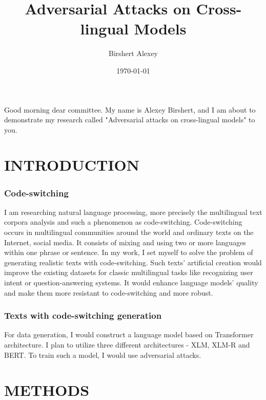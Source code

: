 \documentclass{beamer}
\title{Adversarial Attacks on Cross-lingual Models}
\author{Birshert Alexey}
\date{\today}
\begin{document}
\begin{frame}
Good morning dear committee. My name is Alexey Birshert, and I am about to demonstrate my research called "Adversarial attacks on cross-lingual models" to you.
\end{frame}


\section{INTRODUCTION}

\begin{frame}
\frametitle{Code-switching}
I am researching natural language processing, more precisely the multilingual text corpora analysis and such a phenomenon as code-switching. Code-switching occurs in multilingual communities around the world and ordinary texts on the Internet, social media. It consists of mixing and using two or more languages within one phrase or sentence. In my work, I set myself to solve the problem of generating realistic texts with code-switching. Such texts’ artificial creation would improve the existing datasets for classic multilingual tasks like recognizing user intent or question-answering systems. It would enhance language models’ quality and make them more resistant to code-switching and more robust.
\end{frame}


\begin{frame}
\frametitle{Texts with code-switching generation}
For data generation, I would construct a language model based on Transformer architecture. I plan to utilize three different architectures - XLM, XLM-R and BERT. To train such a model, I would use adversarial attacks.
\end{frame}


\section{METHODS}
\end{document}
